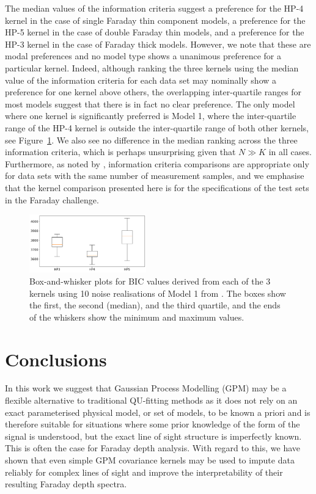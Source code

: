 \documentclass[fleqn,usenatbib]{mnras}
\begin{document}
The median values of the information criteria suggest a preference for the HP-4 kernel in the case of single Faraday thin component models, a preference for the HP-5 kernel in the case of double Faraday thin models, and a preference for the HP-3 kernel in the case of Faraday thick models. However, we note that these are modal preferences and no model type shows a unanimous preference for a particular kernel. Indeed, although ranking the three kernels using the median value of the information criteria for each data set may nominally show a preference for one kernel above others, the overlapping inter-quartile ranges for most models suggest that there is in fact no clear preference. The only model where one kernel is significantly preferred is Model 1, where the inter-quartile range of the HP-4 kernel is outside the inter-quartile range of both other kernels, see Figure~\ref{fig:model1bic}. We also see no difference in the median ranking across the three information criteria, which is perhaps unsurprising given that $N \gg K$ in all cases. Furthermore, as noted by \cite{biccomp}, information criteria comparisons are appropriate only for data sets with the same number of measurement samples, and we emphasise that the kernel comparison presented here is for the specifications of the test sets in the \cite{Sun_2015} Faraday challenge. 
%
\begin{figure}
    \centering
    \includegraphics[width=0.45\textwidth]{./FIGURES/model0_info.png}
    \caption{Box-and-whisker plots for BIC values derived from each of the 3 kernels using 10 noise realisations of Model 1 from \cite{Sun_2015}. The boxes show the first, the second (median), and the third quartile, and the ends of the whiskers show the minimum and maximum values.\label{fig:model1bic}}
\end{figure}



\section{Conclusions}
\label{sec:conclusions}

In this work we suggest that Gaussian Process Modelling (GPM) may be a flexible alternative to traditional QU-fitting methods as it does not rely on an exact parameterised physical model, or set of models, to be known a priori and is therefore suitable for situations where some prior knowledge of the form of the signal is understood, but the exact line of sight structure is imperfectly known. This is often the case for Faraday depth analysis. With regard to this, we have shown that even simple GPM covariance kernels may be used to impute data reliably for complex lines of sight and improve the interpretability of their resulting Faraday depth spectra.
\end{document}
